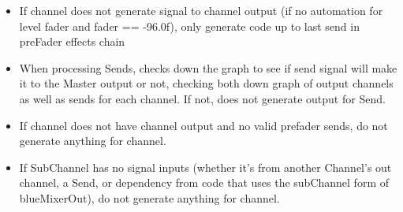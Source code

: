 \begin{itemize}
\item
  If channel does not generate signal to channel output (if no
  automation for level fader and fader == -96.0f), only generate code up
  to last send in preFader effects chain
\item
  When processing Sends, checks down the graph to see if send signal
  will make it to the Master output or not, checking both down graph of
  output channels as well as sends for each channel. If not, does not
  generate output for Send.
\item
  If channel does not have channel output and no valid prefader sends,
  do not generate anything for channel.
\item
  If SubChannel has no signal inputs (whether it's from another
  Channel's out channel, a Send, or dependency from code that uses the
  subChannel form of blueMixerOut), do not generate anything for
  channel.
\end{itemize}
